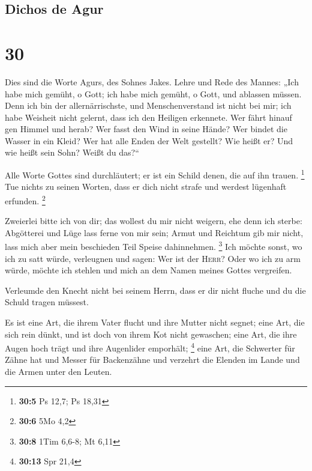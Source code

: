 \hypertarget{dichos-de-agur}{%
\subsection{Dichos de Agur}\label{dichos-de-agur}}

\hypertarget{section-29}{%
\section{30}\label{section-29}}

 Dies sind die Worte Agurs, des Sohnes Jakes. Lehre und
Rede des Mannes: „Ich habe mich gemüht, o Gott; ich habe mich gemüht, o
Gott, und ablassen müssen.  Denn ich bin der
allernärrischste, und Menschenverstand ist nicht bei mir; 
ich habe Weisheit nicht gelernt, dass ich den Heiligen erkennete.
 Wer fährt hinauf gen Himmel und herab? Wer fasst den Wind
in seine Hände? Wer bindet die Wasser in ein Kleid? Wer hat alle Enden
der Welt gestellt? Wie heißt er? Und wie heißt sein Sohn? Weißt du
das?{}``

 Alle Worte Gottes sind durchläutert; er ist ein Schild
denen, die auf ihn trauen. \footnote{\textbf{30:5} Ps 12,7; Ps 18,31}
 Tue nichts zu seinen Worten, dass er dich nicht strafe
und werdest lügenhaft erfunden. \footnote{\textbf{30:6} 5Mo 4,2}

 Zweierlei bitte ich von dir; das wollest du mir nicht
weigern, ehe denn ich sterbe:  Abgötterei und Lüge lass
ferne von mir sein; Armut und Reichtum gib mir nicht, lass mich aber
mein beschieden Teil Speise dahinnehmen. \footnote{\textbf{30:8} 1Tim
  6,6-8; Mt 6,11}  Ich möchte sonst, wo ich zu satt würde,
verleugnen und sagen: Wer ist der \textsc{Herr}? Oder wo ich zu arm
würde, möchte ich stehlen und mich an dem Namen meines Gottes
vergreifen.

 Verleumde den Knecht nicht bei seinem Herrn, dass er dir
nicht fluche und du die Schuld tragen müssest.

 Es ist eine Art, die ihrem Vater flucht und ihre Mutter
nicht segnet;  eine Art, die sich rein dünkt, und ist
doch von ihrem Kot nicht gewaschen;  eine Art, die ihre
Augen hoch trägt und ihre Augenlider emporhält; \footnote{\textbf{30:13}
  Spr 21,4}  eine Art, die Schwerter für Zähne hat und
Messer für Backenzähne und verzehrt die Elenden im Lande und die Armen
unter den Leuten.

